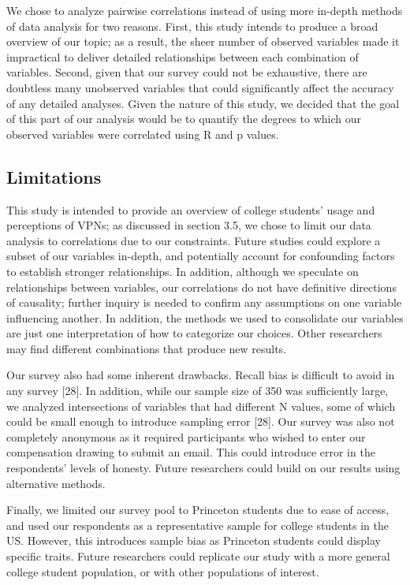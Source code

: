 We chose to analyze pairwise correlations instead of using more in-depth
methods of data analysis for two reasons. First, this study intends to produce
a broad overview of our topic; as a result, the sheer number of observed
variables made it impractical to deliver detailed relationships between each
combination of variables. Second, given that our survey could not be
exhaustive, there are doubtless many unobserved variables that could
significantly affect the accuracy of any detailed analyses. Given the nature
of this study, we decided that the goal of this part of our analysis would be
to quantify the degrees to which our observed variables were correlated using
R and p values.

\subsection{Limitations}

This study is intended to provide an overview of college students' usage and
perceptions of VPNs; as discussed in section 3.5, we chose to limit our data
analysis to correlations due to our constraints. Future studies could explore
a subset of our variables in-depth, and potentially account for confounding
factors to establish stronger relationships. In addition, although we
speculate on relationships between variables, our correlations do not have
definitive directions of causality; further inquiry is needed to confirm any
assumptions on one variable influencing another. In addition, the methods we
used to consolidate our variables are just one interpretation of how to
categorize our choices. Other researchers may find different combinations that
produce new results.

Our survey also had some inherent drawbacks. Recall bias is difficult to avoid
in any survey [28]. In addition, while our sample size of 350 was sufficiently
large, we analyzed intersections of variables that had different N values,
some of which could be small enough to introduce sampling error [28]. Our
survey was also not completely anonymous as it required participants who
wished to enter our compensation drawing to submit an email. This could
introduce error in the respondents' levels of honesty. Future researchers
could build on our results using alternative methods.

Finally, we limited our survey pool to Princeton students due to ease of
access, and used our respondents as a representative sample for college
students in the US. However, this introduces sample bias as Princeton students
could display specific traits. Future researchers could replicate our study
with a more general college student population, or with other populations of
interest.
